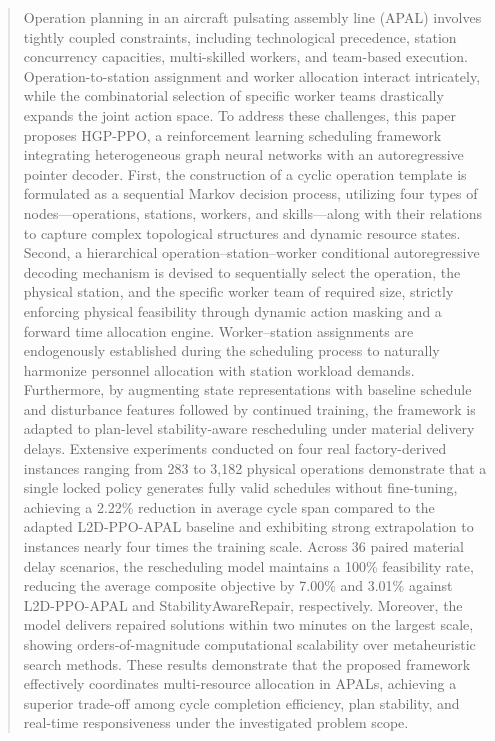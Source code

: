 \documentclass[journal,10pt]{IEEEtran}
\begin{document}
\begin{abstract}
Operation planning in an aircraft pulsating assembly line (APAL) involves tightly coupled constraints, including technological precedence, station concurrency capacities, multi-skilled workers, and team-based execution. Operation-to-station assignment and worker allocation interact intricately, while the combinatorial selection of specific worker teams drastically expands the joint action space. To address these challenges, this paper proposes HGP-PPO, a reinforcement learning scheduling framework integrating heterogeneous graph neural networks with an autoregressive pointer decoder. First, the construction of a cyclic operation template is formulated as a sequential Markov decision process, utilizing four types of nodes---operations, stations, workers, and skills---along with their relations to capture complex topological structures and dynamic resource states. Second, a hierarchical operation--station--worker conditional autoregressive decoding mechanism is devised to sequentially select the operation, the physical station, and the specific worker team of required size, strictly enforcing physical feasibility through dynamic action masking and a forward time allocation engine. Worker--station assignments are endogenously established during the scheduling process to naturally harmonize personnel allocation with station workload demands. Furthermore, by augmenting state representations with baseline schedule and disturbance features followed by continued training, the framework is adapted to plan-level stability-aware rescheduling under material delivery delays. Extensive experiments conducted on four real factory-derived instances ranging from 283 to 3,182 physical operations demonstrate that a single locked policy generates fully valid schedules without fine-tuning, achieving a 2.22\% reduction in average cycle span compared to the adapted L2D-PPO-APAL baseline and exhibiting strong extrapolation to instances nearly four times the training scale. Across 36 paired material delay scenarios, the rescheduling model maintains a 100\% feasibility rate, reducing the average composite objective by 7.00\% and 3.01\% against L2D-PPO-APAL and StabilityAwareRepair, respectively. Moreover, the model delivers repaired solutions within two minutes on the largest scale, showing orders-of-magnitude computational scalability over metaheuristic search methods. These results demonstrate that the proposed framework effectively coordinates multi-resource allocation in APALs, achieving a superior trade-off among cycle completion efficiency, plan stability, and real-time responsiveness under the investigated problem scope.
\end{abstract}
\end{document}
